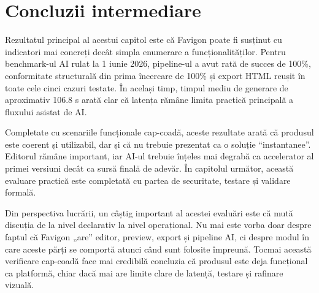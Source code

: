 \section{Concluzii intermediare}

Rezultatul principal al acestui capitol este că Favigon poate fi susținut cu indicatori mai concreți decât simpla enumerare a funcționalităților. Pentru benchmark-ul AI rulat la 1 iunie 2026, pipeline-ul a avut rată de succes de 100\%, conformitate structurală din prima încercare de 100\% și export HTML reușit în toate cele cinci cazuri testate. În același timp, timpul mediu de generare de aproximativ 106.8 s arată clar că latența rămâne limita practică principală a fluxului asistat de AI.

Completate cu scenariile funcționale cap-coadă, aceste rezultate arată că produsul este coerent și utilizabil, dar și că nu trebuie prezentat ca o soluție ``instantanee''. Editorul rămâne important, iar AI-ul trebuie înțeles mai degrabă ca accelerator al primei versiuni decât ca sursă finală de adevăr. În capitolul următor, această evaluare practică este completată cu partea de securitate, testare și validare formală.

Din perspectiva lucrării, un câștig important al acestei evaluări este că mută discuția de la nivel declarativ la nivel operațional. Nu mai este vorba doar despre faptul că Favigon „are” editor, preview, export și pipeline AI, ci despre modul în care aceste părți se comportă atunci când sunt folosite împreună. Tocmai această verificare cap-coadă face mai credibilă concluzia că produsul este deja funcțional ca platformă, chiar dacă mai are limite clare de latență, testare și rafinare vizuală.
